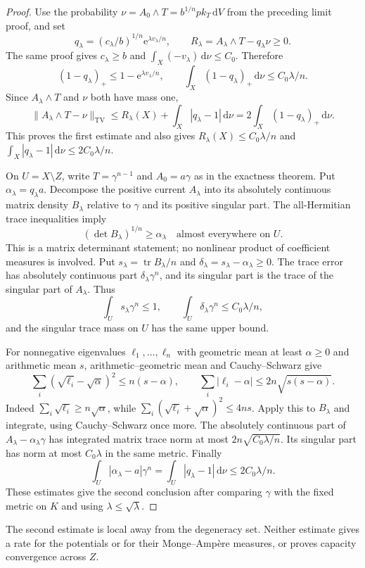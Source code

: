 \begin{proof}
Use the probability $\nu=A_0\wedge T=b^{1/n}p k_T\,\mathrm{d}V$ from the preceding limit proof, and set
\[
 q_\lambda=(c_\lambda/b)^{1/n}\mathrm{e}^{\lambda v_\lambda/n},
 \qquad R_\lambda=A_\lambda\wedge T-q_\lambda\nu\geq0.
\]
The same proof gives $c_\lambda\geq b$ and $\int_X(-v_\lambda)\,\mathrm{d}\nu\leq C_0$. Therefore
\[
 (1-q_\lambda)_+\leq1-\mathrm{e}^{\lambda v_\lambda/n},
 \qquad
 \int_X(1-q_\lambda)_+\,\mathrm{d}\nu\leq C_0\lambda/n.
\]
Since $A_\lambda\wedge T$ and $\nu$ both have mass one,
\[
 \|A_\lambda\wedge T-\nu\|_{\mathrm{TV}}
 \leq R_\lambda(X)+\int_X|q_\lambda-1|\,\mathrm{d}\nu
 =2\int_X(1-q_\lambda)_+\,\mathrm{d}\nu.
\]
This proves the first estimate and also gives
$R_\lambda(X)\leq C_0\lambda/n$ and
$\int_X|q_\lambda-1|\,\mathrm{d}\nu\leq2C_0\lambda/n$.

On $U=X\setminus Z$, write $T=\gamma^{n-1}$ and $A_0=a\gamma$ as in the exactness theorem. Put $\alpha_\lambda=q_\lambda a$. Decompose the positive current $A_\lambda$ into its absolutely continuous matrix density $B_\lambda$ relative to $\gamma$ and its positive singular part. The all-Hermitian trace inequalities imply
\[
 (\det B_\lambda)^{1/n}\geq\alpha_\lambda
 \quad\text{almost everywhere on }U.
\]
This is a matrix determinant statement; no nonlinear product of coefficient measures is involved. Put $s_\lambda=\operatorname{tr}B_\lambda/n$ and $\delta_\lambda=s_\lambda-\alpha_\lambda\geq0$. The trace error has absolutely continuous part $\delta_\lambda\gamma^n$, and its singular part is the trace of the singular part of $A_\lambda$. Thus
\[
 \int_U s_\lambda\gamma^n\leq1,\qquad
 \int_U\delta_\lambda\gamma^n\leq C_0\lambda/n,
\]
and the singular trace mass on $U$ has the same upper bound.

For nonnegative eigenvalues $\ell_1,\ldots,\ell_n$ with geometric mean at least $\alpha\geq0$ and arithmetic mean $s$, arithmetic--geometric mean and Cauchy--Schwarz give
\[
 \sum_i(\sqrt{\ell_i}-\sqrt\alpha)^2\leq n(s-\alpha),
 \qquad
 \sum_i|\ell_i-\alpha|\leq2n\sqrt{s(s-\alpha)}.
\]
Indeed $\sum_i\sqrt{\ell_i}\geq n\sqrt\alpha$, while
$\sum_i(\sqrt{\ell_i}+\sqrt\alpha)^2\leq4ns$.
Apply this to $B_\lambda$ and integrate, using Cauchy--Schwarz once more. The absolutely continuous part of $A_\lambda-\alpha_\lambda\gamma$ has integrated matrix trace norm at most $2n\sqrt{C_0\lambda/n}$. Its singular part has norm at most $C_0\lambda$ in the same metric. Finally
\[
 \int_U|\alpha_\lambda-a|\gamma^n
   =\int_U|q_\lambda-1|\,\mathrm{d}\nu
   \leq2C_0\lambda/n.
\]
These estimates give the second conclusion after comparing $\gamma$ with the fixed metric on $K$ and using $\lambda\leq\sqrt\lambda$.
\end{proof}

The second estimate is local away from the degeneracy set. Neither estimate gives a rate for the potentials or for their Monge--Amp\`ere measures, or proves capacity convergence across $Z$.
